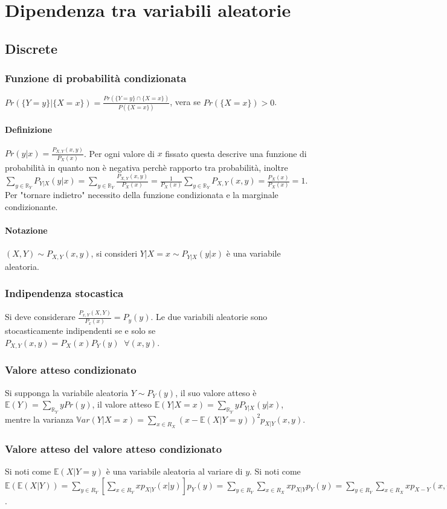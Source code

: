 \chapter{Dipendenza tra variabili aleatorie}
\section{Discrete}
\subsection{Funzione di probabilit\`a condizionata}
$Pr(\{Y=y\}|\{X=x\})=\frac{Pr(\{Y=y\}\cap\{X=x\})}{P(\{X=x\})}$, vera se $Pr(\{X=x\})>0$. 
\subsubsection{Definizione}
$Pr(y|x)=\frac{P_{X,Y}(x, y)}{P_X(x)}$. Per ogni valore di $x$ fissato questa descrive una funzione di probabilit\`a in quanto non \`e negativa perch\`e rapporto tra 
probabilit\`a, inoltre $\sum\limits_{y\in\mathbb{R}_Y}P_{Y|X}(y|x)=\sum\limits_{y\in\mathbb{R}_Y}\frac{P_{X,Y}(x, y)}{P_X(x)}=\frac{1}{P_X(x)}\sum\limits_{y\in\mathbb{R}_Y}
P_{X,Y}(x, y)=\frac{P_X(x)}{P_X(x)}=1$. Per "tornare indietro" necessito della funzione condizionata e la marginale condizionante. 
\subsubsection{Notazione}
$(X,Y)\sim P_{X,Y}(x, y)$, si consideri $Y|X=x\sim P_{Y|X}(y|x)$ \`e una variabile aleatoria. 
\subsection{Indipendenza stocastica}
Si deve considerare $\frac{P_{x, Y}(X, Y)}{P_x(x)}=P_y(y)$. Le due variabili aleatorie sono stocasticamente indipendenti se e solo se $P_{X,Y}(x, y)=P_X(x)P_Y(y)\;\;\forall (x, 
y)$. 
\subsection{Valore atteso condizionato}
Si supponga la variabile aleatoria $Y\sim P_Y(y)$, il suo valore atteso \`e $\mathbb{E}(Y)=\sum\limits_{\mathbb{R}_Y}yPr(y)$, il valore atteso $\mathbb{E}(Y|X=x)=\sum
\limits_{\mathbb{R}_Y}yP_{Y|X}(y|x)$, mentre la varianza $\mathbb{V}ar(Y|X=x)=\sum\limits_{x\in R_X}(x-\mathbb{E}(X|Y=y))^2p_{X|Y}(x,y)$. 
\subsection{Valore atteso del valore atteso condizionato}
Si noti come $\mathbb{E}(X|Y=y)$ \`e una variabile aleatoria al variare di $y$. Si noti come $\mathbb{E}(\mathbb{E}(X|Y))=\sum\limits_{y\in R_Y}[\sum\limits_{x\in R_Y}xp_{X|Y}
(x|y)]p_Y(y)=\sum\limits_{y\in R_Y}\sum\limits_{x\in R_X}xp_{X|Y}p_Y(y)=\sum\limits_{y\in R_Y}\sum\limits_{x\in R_X}xp_{X-Y}(x,y)=\sum\limits_{x\in R_X}xp_{X}(x)=\mathbb{E}(X)$.

